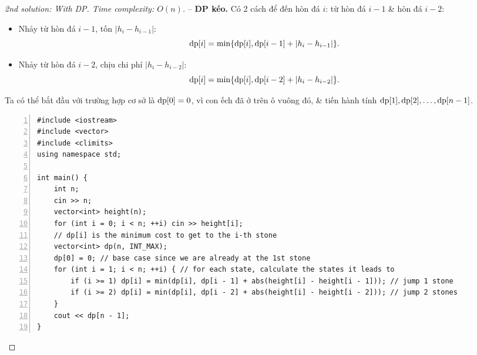 \documentclass{article}
\begin{document}
\begin{proof}[2nd solution: With DP. Time complexity: $O(n)$]
    -- {\bf DP kéo.} Có 2 cách để đến hòn đá $i$: từ hòn đá $i - 1$ \& hòn đá $i - 2$:
    \begin{itemize}
        \item Nhảy từ hòn đá $i - 1$, tốn $|h_i - h_{i-1}|$:
        \begin{equation*}
            {\rm dp}[i] = \min\{{\rm dp}[i],{\rm dp}[i - 1] + |h_i - h_{i-1}|\}.
        \end{equation*}
        \item Nhảy từ hòn đá $i - 2$, chịu chi phí $|h_i - h_{i-2}|$:
        \begin{equation*}
            {\rm dp}[i] = \min\{{\rm dp}[i],{\rm dp}[i - 2] + |h_i - h_{i-2}|\}.
        \end{equation*}
    \end{itemize}
    Ta có thể bắt đầu với trường hợp cơ sở là ${\rm dp}[0] = 0$, vì con ếch đã ở trên ô vuông đó, \& tiến hành tính ${\rm dp}[1],{\rm dp}[2],\ldots,{\rm dp}[n - 1]$.
    \begin{Verbatim}[numbers=left,xleftmargin=5mm]
#include <iostream>
#include <vector>
#include <climits>
using namespace std;

int main() {
    int n;
    cin >> n;
    vector<int> height(n);
    for (int i = 0; i < n; ++i) cin >> height[i];
    // dp[i] is the minimum cost to get to the i-th stone
    vector<int> dp(n, INT_MAX);
    dp[0] = 0; // base case since we are already at the 1st stone
    for (int i = 1; i < n; ++i) { // for each state, calculate the states it leads to
        if (i >= 1) dp[i] = min(dp[i], dp[i - 1] + abs(height[i] - height[i - 1])); // jump 1 stone
        if (i >= 2) dp[i] = min(dp[i], dp[i - 2] + abs(height[i] - height[i - 2])); // jump 2 stones
    }
    cout << dp[n - 1];
}
    \end{Verbatim}
\end{proof}

\end{document}
